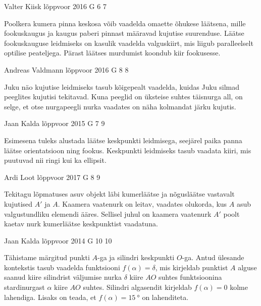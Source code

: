 \documentclass[11pt]{article}
\begin{document}
{%
{Valter Kiisk} %
{lõppvoor} %
{2016} %
{G 6} %
{7} %
{

\ifHint
Poolkera kumera pinna keskosa võib vaadelda omaette õhukese läätsena, mille fookuskaugus ja kaugus paberi pinnast määravad kujutise suurenduse. Läätse fookuskauguse leidmiseks on kasulik vaadelda valguskiirt, mis liigub paralleelselt optilise peateljega. Pärast läätses murdumist koondub kiir fookusesse.
\fi
}

{Andreas Valdmann} %
{lõppvoor} %
{2016} %
{G 8} %
{8} %
{

\ifHint
Juku näo kujutise leidmiseks tasub kõigepealt vaadelda, kuidas Juku silmad peeglites kujutisi tekitavad. Kuna peeglid on üksteise suhtes täisnurga all, on selge, et otse nurgapeegli nurka vaadates on näha kolmandat järku kujutis.
\fi
}

{Jaan Kalda} %
{lõppvoor} %
{2015} %
{G 7} %
{9} %
{

\ifHint
Esimesena tuleks alustada läätse keskpunkti leidmisega, seejärel paika panna läätse orientatsioon ning fookus. Keskpunkti leidmiseks tasub vaadata kiiri, mis puutuvad nii ringi kui ka ellipsit.
\fi
}

{Ardi Loot} %
{lõppvoor} %
{2017} %
{G 8} %
{9} %
{

\ifHint
Tekitagu lõpmatuses asuv objekt läbi kumerläätse ja nõgusläätse vastavalt kujutised $A'$ ja $A$. Kaamera vaatenurk on leitav, vaadates olukorda, kus $A$ asub valgustundliku elemendi ääres. Sellisel juhul on kaamera vaatenurk $A'$ poolt kaetav nurk kumerläätse keskpunktist vaadatuna.
\fi
}

{Jaan Kalda} %
{lõppvoor} %
{2014} %
{G 10} %
{10} %
{

\ifHint
Tähistame märgitud punkti $A$-ga ja silindri keskpunkti $O$-ga. Antud ülesande kontekstis tasub vaadelda funktsiooni $f(\alpha) = \delta$, mis kirjeldab punktist $A$ alguse saanud kiire silindrist väljumise nurka $\delta$ kiire $AO$ suhtes funktsioonina stardinurgast $\alpha$ kiire $AO$ suhtes. Silindri algasendit kirjeldab $f(\alpha) = 0$ kolme lahendiga. Lisaks on teada, et $f(\alpha) = \SI{15}{\degree}$ on lahenditeta.
\fi
}

}
\end{document}
